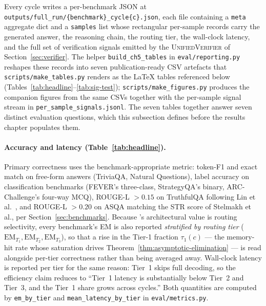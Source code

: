 Every cycle writes a per-benchmark JSON at \texttt{outputs/full\_run/\{benchmark\}\_cycle\{c\}.json}, each file containing a \texttt{meta} aggregate dict and a \texttt{samples} list whose rectangular per-sample records carry the generated answer, the reasoning chain, the routing tier, the wall-clock latency, and the full set of verification signals emitted by the \textsc{UnifiedVerifier} of Section~\ref{sec:verifier}. The helper \texttt{build\_ch5\_tables} in \texttt{eval/reporting.py} reshapes these records into seven publication-ready CSV artefacts that \texttt{scripts/make\_tables.py} renders as the LaTeX tables referenced below (Tables~\ref{tab:headline}--\ref{tab:sig-test}); \texttt{scripts/make\_figures.py} produces the companion figures from the same CSVs together with the per-sample signal stream in \texttt{per\_sample\_signals.jsonl}. The seven tables together answer seven distinct evaluation questions, which this subsection defines before the results chapter populates them.

\paragraph{Accuracy and latency (Table~\ref{tab:headline}).}
Primary correctness uses the benchmark-appropriate metric: token-F1 and exact match on free-form answers (TriviaQA, Natural Questions), label accuracy on classification benchmarks (FEVER's three-class, StrategyQA's binary, ARC-Challenge's four-way MCQ), ROUGE-L $> 0.15$ on TruthfulQA following Lin et al.~\cite{lin-etal-2022-truthfulqa}, and ROUGE-L $> 0.20$ on ASQA matching the STR score of Stelmakh et al., per Section~\ref{sec:benchmarks}. Because \caem{}'s architectural value is routing selectivity, every benchmark's EM is also reported \emph{stratified by routing tier} ($\mathrm{EM}_{T_{1}}, \mathrm{EM}_{T_{2}}, \mathrm{EM}_{T_{3}}$), so that a rise in the Tier-1 fraction $\tau_{1}(c)$ --- the memory-hit rate whose saturation drives Theorem~\ref{thm:asymptotic-elimination} --- is read alongside per-tier correctness rather than being averaged away. Wall-clock latency is reported per tier for the same reason: Tier~1 skips full decoding, so the efficiency claim reduces to ``Tier~1 latency is substantially below Tier~2 and Tier~3, and the Tier~1 share grows across cycles.'' Both quantities are computed by \texttt{em\_by\_tier} and \texttt{mean\_latency\_by\_tier} in \texttt{eval/metrics.py}.

